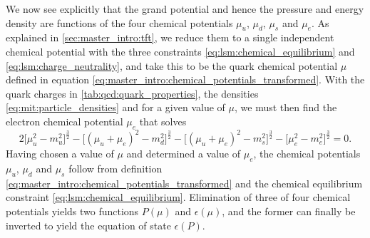We now see explicitly that the grand potential and hence the pressure and energy density are functions of the four chemical potentials $\mu_u$, $\mu_d$, $\mu_s$ and $\mu_e$.
As explained in \cref{sec:master_intro:tft},
we reduce them to a single independent chemical potential with the three constraints \eqref{eq:lsm:chemical_equilibrium} and \eqref{eq:lsm:charge_neutrality},
and take this to be the quark chemical potential $\mu$ defined in equation \eqref{eq:master_intro:chemical_potentials_transformed}.
With the quark charges in \cref{tab:qcd:quark_properties}, the densities \eqref{eq:mit:particle_densities} and for a given value of $\mu$,
we must then find the electron chemical potential $\mu_e$ that solves
\begin{equation}
	2 \Big[\mu_u^2-m_u^2\Big]^\frac32
	- \Big[(\mu_u+\mu_e)^2-m_d^2\Big]^\frac32 
	- \Big[(\mu_u+\mu_e)^2-m_s^2\Big]^\frac32 
	- \Big[\mu_e^2-m_e^2\Big]^\frac32 = 0.
\label{eq:mit:charge_neutrality_explicit}
\end{equation}
Having chosen a value of $\mu$ and determined a value of $\mu_e$,
the chemical potentials $\mu_u$, $\mu_d$ and $\mu_s$ follow from definition \eqref{eq:master_intro:chemical_potentials_transformed} and the chemical equilibrium constraint \eqref{eq:lsm:chemical_equilibrium}. 
Elimination of three of four chemical potentials yields two functions $P(\mu)$ and $\epsilon(\mu)$,
and the former can finally be inverted to yield the equation of state $\epsilon(P)$.


